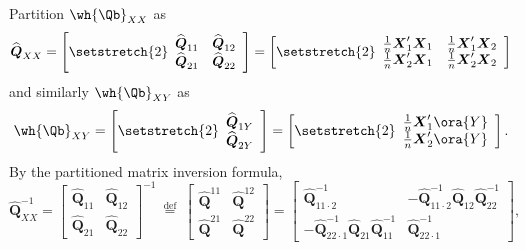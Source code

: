 Partition $\wh{\Qb}_{XX}$ as 
\begin{equation}
    \notag
    \widehat{\boldsymbol{Q}}_{X X}=\left[{\setstretch{2}\begin{array}{ll}
        \widehat{\boldsymbol{Q}}_{11} & \widehat{\boldsymbol{Q}}_{12} \\
        \widehat{\boldsymbol{Q}}_{21} & \widehat{\boldsymbol{Q}}_{22}
        \end{array}}\right]=\left[{\setstretch{2}\begin{array}{cc}
        \frac{1}{n} \boldsymbol{X}_1^{\prime} \boldsymbol{X}_1 & \frac{1}{n} \boldsymbol{X}_1^{\prime} \boldsymbol{X}_2 \\
        \frac{1}{n} \boldsymbol{X}_2^{\prime} \boldsymbol{X}_1 & \frac{1}{n} \boldsymbol{X}_2^{\prime} \boldsymbol{X}_2
    \end{array}}\right]
\end{equation}
and similarly $\wh{\Qb}_{XY}$ as 
\begin{equation}
    \notag
    \wh{\Qb}_{XY} =\left[{\setstretch{2}\begin{array}{l}
        \widehat{\boldsymbol{Q}}_{1Y} \\
        \widehat{\boldsymbol{Q}}_{2Y} \end{array}}\right]=\left[{\setstretch{2}\begin{array}{l}
            \frac{1}{n} \boldsymbol{X}_1^{\prime} \ora{Y} \\
            \frac{1}{n} \boldsymbol{X}_2^{\prime} \ora{Y}
        \end{array}}\right] .
\end{equation}
By the partitioned matrix inversion formula,
\begin{equation}
    \label{3.39}
    \widehat{\mathbf{Q}}_{X X}^{-1}=\left[\begin{array}{cc}
        \widehat{\boldsymbol{Q}}_{11} & \widehat{\mathbf{Q}}_{12} \\
        \widehat{\mathbf{Q}}_{21} & \widehat{\mathbf{Q}}_{22}
        \end{array}\right]^{-1} \stackrel{\text { def }}{=}\left[\begin{array}{cc}
        \widehat{\boldsymbol{Q}}^{11} & \widehat{\boldsymbol{Q}}^{12} \\
        \widehat{\boldsymbol{Q}}^{21} & \widehat{\boldsymbol{Q}}^{22}
        \end{array}\right]=\left[\begin{array}{cc}
        \widehat{\boldsymbol{Q}}_{11 \cdot 2}^{-1} & -\widehat{\mathbf{Q}}_{11 \cdot 2}^{-1} \widehat{\mathbf{Q}}_{12} \widehat{\mathbf{Q}}_{22}^{-1} \\
        -\widehat{\boldsymbol{Q}}_{22 \cdot 1}^{-1} \widehat{\mathbf{Q}}_{21} \widehat{\boldsymbol{Q}}_{11}^{-1} & \widehat{\boldsymbol{Q}}_{22 \cdot 1}^{-1}
        \end{array}\right] ,
\end{equation}

